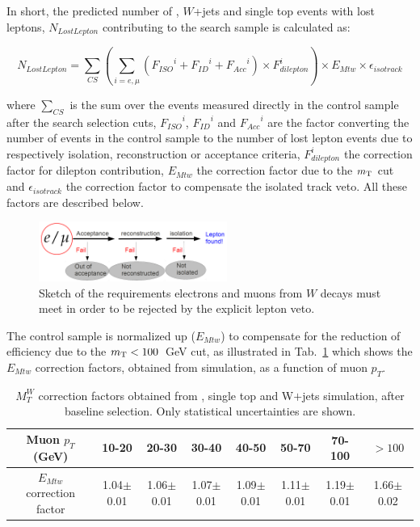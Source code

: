 In short, the predicted number of \ttbar, $W$+jets and single top events with lost leptons, $N_{LostLepton}$ contributing to the search sample is calculated as:

\begin{equation}
N_{LostLepton}= \sum_{CS} (\sum_{i={e,\mu}}({F_{ISO}}^{i}+{F_{ID}}^{i}+{F_{Acc}}^{i}) \times F_{dilepton}^{i}) \times E_{Mtw} \times \epsilon_{isotrack}
\label{eq:lostleptonequation}
\end{equation}

where $\sum_{CS}$ is the sum over the events measured directly in the control sample
after the search selection cuts, ${F_{ISO}}^{i}$, ${F_{ID}}^{i}$ and ${F_{Acc}}^{i}$ are the factor converting the number of events in the control sample to the number of lost lepton events due to respectively isolation, reconstruction or acceptance criteria, $F_{dilepton}^{i}$ the correction factor for dilepton contribution, $E_{Mtw}$ the correction factor due to the $m_{\rm T}$ cut and $\epsilon_{isotrack}$ the correction factor to compensate the isolated track veto. All these factors are described below.

\begin{figure}[htbp]
\begin{center}
\includegraphics[width=0.55\textwidth]{sections/mc4/Backgrounds/LostLepton/figures/lepton_veto_sketch.png}
\end{center}
\caption{Sketch of the requirements electrons and muons from $W$ decays must meet in order to be rejected by the explicit lepton veto.}
\label{fig:method}
\end{figure}

The control sample is normalized up ($E_{Mtw}$) to compensate for 
the reduction of 
efficiency due to the $m_{\rm T}<100$~GeV cut, as illustrated in 
Tab.~\ref{tab:mtw} which shows the 
$E_{Mtw}$ correction factors, obtained from simulation, as a function of muon $p_{T}$. 

\begin{table}[htbp]
\fontsize{10 pt}{1.2 em}
\caption{$M_{T}^{W}$ correction factors obtained from \ttbar, single top and W$+$jets simulation, after baseline selection. Only statistical uncertainties are shown.}
\begin{center}
\begin{tabular}{|c|c|c|c|c|c|c|c|}
\hline
Muon $p_T$ (GeV) & 10-20 & 20-30 & 30-40 & 40-50 & 50-70 & 70-100 & $>100$ \\
\hline
$E_{Mtw}$ correction factor & 1.04$\pm$0.01 & 1.06$\pm$0.01 & 1.07$\pm$0.01 & 1.09$\pm$0.01 & 1.11$\pm$0.01 & 1.19$\pm$0.01 & 1.66$\pm$0.02 \\
\hline
\end{tabular}
\end{center}
\label{tab:mtw}
\end{table}


